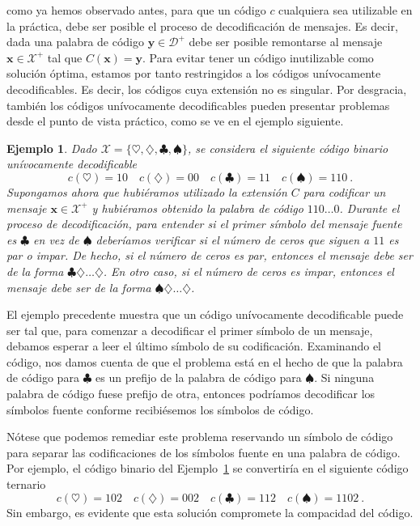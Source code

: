 \documentclass[11pt]{article}
\newtheorem{example}[theorem]{Ejemplo}
\newcommand{\bx}{ \boldsymbol{x} }
\newcommand{\by}{ \boldsymbol{y} }
\newcommand{\scD}{\mathcal{D}}
\newcommand{\scX}{\mathcal{X}}
\begin{document}
como ya hemos observado antes, para que un código $c$ cualquiera sea utilizable en la práctica, debe ser posible el proceso de decodificación de mensajes. Es decir, dada una palabra de código $\by\in\scD^+$ debe ser posible remontarse al mensaje $\bx\in\scX^+$ tal que $C(\bx)=\by$. Para evitar tener un código inutilizable como solución óptima, estamos por tanto restringidos a los códigos unívocamente decodificables. Es decir, los códigos cuya extensión no es singular. Por desgracia, también los códigos unívocamente decodificables pueden presentar problemas desde el punto de vista práctico, como se ve en el ejemplo siguiente.
%
\begin{example}
\label{ex:ud}
Dado $\scX = \{\heartsuit,\diamondsuit,\clubsuit,\spadesuit\}$, se considera el siguiente código binario unívocamente decodificable
\[
    c(\heartsuit) = 10 \quad c(\diamondsuit) = 00 \quad c(\clubsuit) = 11 \quad c(\spadesuit) = 110~.
\]
Supongamos ahora que hubiéramos utilizado la extensión $C$ para codificar un mensaje $\bx\in\scX^+$ y hubiéramos obtenido la palabra de código $110\dots 0$. Durante el proceso de decodificación, para entender si el primer símbolo del mensaje fuente es $\clubsuit$ en vez de $\spadesuit$ deberíamos verificar si el número de ceros que siguen a $11$ es par o impar. De hecho, si el número de ceros es par, entonces el mensaje debe ser de la forma $\clubsuit\diamondsuit\dots\diamondsuit$. En otro caso, si el número de ceros es impar, entonces el mensaje debe ser de la forma $\spadesuit\diamondsuit\dots\diamondsuit$.
\end{example}
%
El ejemplo precedente muestra que un código unívocamente decodificable puede ser tal que, para comenzar a decodificar el primer símbolo de un mensaje, debamos esperar a leer el último símbolo de su codificación. Examinando el código, nos damos cuenta de que el problema está en el hecho de que la palabra de código para $\clubsuit$ es un prefijo de la palabra de código para $\spadesuit$. Si ninguna palabra de código fuese prefijo de otra, entonces podríamos decodificar los símbolos fuente conforme recibiésemos los símbolos de código.

Nótese que podemos remediar este problema reservando un símbolo de código para separar las codificaciones de los símbolos fuente en una palabra de código. Por ejemplo, el código binario del Ejemplo~\ref{ex:ud} se convertiría en el siguiente código ternario
\[
    c(\heartsuit) = 102 \quad c(\diamondsuit) = 002 \quad c(\clubsuit) = 112 \quad c(\spadesuit) = 1102~.
\]
Sin embargo, es evidente que esta solución compromete la compacidad del código.
\end{document}
